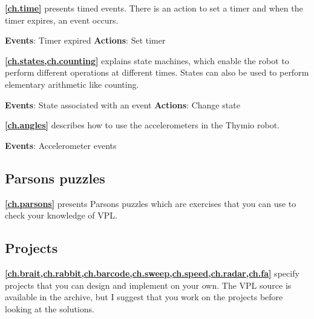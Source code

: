  \quad {} \hfill {}
\quad {} \quad {}

\medskip


\medskip

\textbf{\cref{ch.time}} presents timed events. There is an action
to set a timer and when the timer expires, an event occurs.

\textbf{Events}: Timer expired \hfill \textbf{Actions}: Set timer

 \hfill {}

\medskip

\textbf{\cref{ch.states,ch.counting}} explains state machines, which
enable the robot to perform different operations at different times.
States can also be used to perform elementary arithmetic like counting.

\textbf{Events}: State associated with an event \hfill \textbf{Actions}:
Change state

 \hfill {}

\medskip

\textbf{\cref{ch.angles}} describes how to use the accelerometers
in the Thymio robot.

\textbf{Events}: Accelerometer events

 \quad {}

\medskip

\subsection*{Parsons puzzles}

\textbf{\cref{ch.parsons}} presents Parsons puzzles which are exercises
that you can use to check your knowledge of VPL.

\medskip

\subsection*{Projects}

\textbf{\cref{ch.brait,ch.rabbit,ch.barcode,ch.sweep,ch.speed,ch.radar,ch.fa}}
specify projects that you can design and implement on your own.
The VPL source is available in the archive, but I suggest that you work
on the projects before looking at the solutions.

